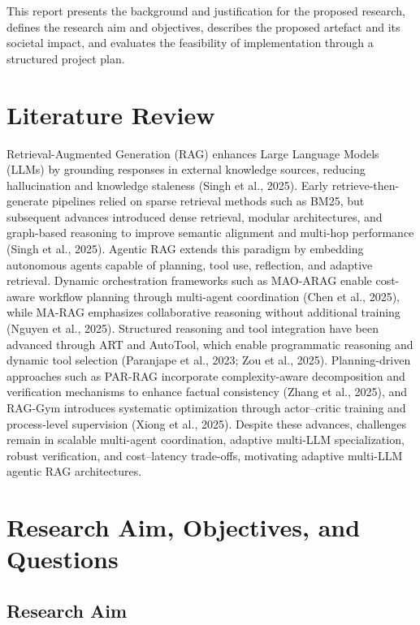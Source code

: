 \documentclass[12pt,a4paper]{article}
\begin{document}
This report presents the background and justification for the proposed research, defines the research aim and objectives, describes the proposed artefact and its societal impact, and evaluates the feasibility of implementation through a structured project plan.

\section{Literature Review}

Retrieval-Augmented Generation (RAG) enhances Large Language Models (LLMs) by grounding responses in external 
knowledge sources, reducing hallucination and knowledge staleness (Singh et al., 2025). Early retrieve-then-generate 
pipelines relied on sparse retrieval methods such as BM25, but subsequent advances introduced dense retrieval, 
modular architectures, and graph-based reasoning to improve semantic alignment and multi-hop performance 
(Singh et al., 2025). Agentic RAG extends this paradigm by embedding autonomous agents capable of planning, tool 
use, reflection, and adaptive retrieval. Dynamic orchestration frameworks such as MAO-ARAG enable cost-aware workflow planning through multi-agent coordination (Chen et al., 2025), while MA-RAG emphasizes collaborative reasoning without additional training (Nguyen et al., 2025). Structured reasoning and tool integration have been advanced through ART and AutoTool, which enable programmatic reasoning and dynamic tool selection (Paranjape et al., 2023; Zou et al., 2025). Planning-driven approaches such as PAR-RAG incorporate complexity-aware decomposition and verification mechanisms to enhance factual consistency (Zhang et al., 2025), and RAG-Gym introduces systematic optimization through actor–critic training and process-level supervision (Xiong et al., 2025). Despite these advances, challenges remain in scalable multi-agent coordination, adaptive multi-LLM specialization, robust verification, and cost–latency trade-offs, motivating adaptive multi-LLM agentic RAG architectures.


\section{Research Aim, Objectives, and Questions}

\subsection{Research Aim}
\end{document}
